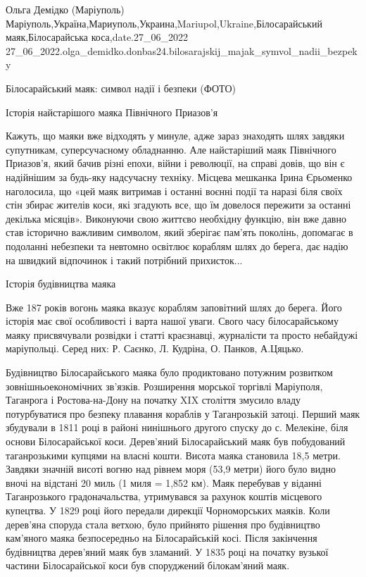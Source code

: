  
 
 
 
 

Ольга Демідко (Маріуполь)
Маріуполь,Україна,Мариуполь,Украина,Mariupol,Ukraine,Білосарайський маяк,Білосарайська коса,date.27_06_2022
27_06_2022.olga_demidko.donbas24.bilosarajskij_majak_symvol_nadii_bezpeky

Білосарайський маяк: символ надії і безпеки (ФОТО)

Історія найстарішого маяка Північного Приазов'я

Кажуть, що маяки вже відходять у минуле, адже зараз знаходять шлях завдяки
супутникам, суперсучасному обладнанню. Але найстаріший маяк Північного
Приазов'я, який бачив різні епохи, війни і революції, на справі довів, що він є
надійнішим за будь-яку надсучасну техніку. Місцева мешканка Ірина Єрьоменко
наголосила, що «цей маяк витримав і останні воєнні події та наразі біля своїх
стін збирає жителів коси, які згадують все, що їм довелося пережити за останні
декілька місяців». Виконуючи свою життєво необхідну функцію, він вже давно став
історично важливим символом, який зберігає пам'ять поколінь, допомагає в
подоланні небезпеки та невтомно освітлює кораблям шлях до берега, дає надію на
швидкий відпочинок і такий потрібний прихисток...

Історія будівництва маяка 

Вже 187 років вогонь маяка вказує кораблям заповітний шлях до берега. Його
історія має свої особливості і варта нашої уваги. Свого часу білосарайському
маяку присвячували розвідки і статті краєзнавці, журналісти та просто небайдужі
маріупольці. Серед них: Р. Саєнко, Л. Кудріна, О. Панков, А.Цяцько.

Будівництво Білосарайського маяка було продиктовано потужним розвитком
зовнішньоекономічних зв’язків. Розширення морської торгівлі Маріуполя,
Таганрога і Ростова-на-Дону на початку XIX століття змусило владу потурбуватися
про безпеку плавання кораблів у Таганрозькій затоці. Перший маяк збудували в
1811 році в районі нинішнього другого спуску до с. Мелекіне, біля основи
Білосарайської коси. Дерев’яний Білосарайський маяк був побудований
таганрозькими купцями на власні кошти. Висота маяка становила 18,5 метри.
Завдяки значній висоті вогню над рівнем моря (53,9 метри) його було видно вночі
на відстані 20 миль (1 миля = 1,852 км). Маяк перебував у віданні Таганрозького
градоначальства, утримувався за рахунок коштів місцевого купецтва. У 1829 році
його передали дирекції Чорноморських маяків. Коли дерев’яна споруда стала
ветхою, було прийнято рішення про будівництво кам’яного маяка безпосередньо на
Білосарайській косі. Після закінчення будівництва дерев’яний маяк був зламаний.
У 1835 році на початку вузької частини Білосарайської коси був споруджений
білокам'яний маяк.

